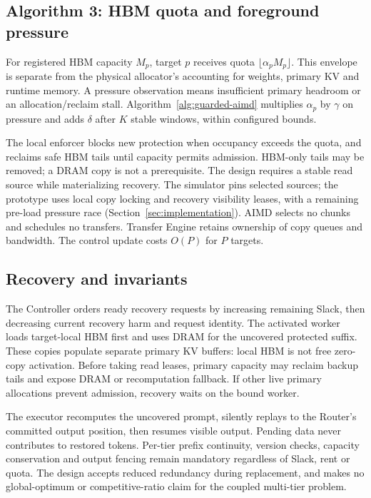 \subsection{Algorithm 3: HBM quota and foreground pressure}
For registered HBM capacity $M_p$, target $p$ receives quota
$\lfloor\alpha_pM_p\rfloor$. This envelope is separate from the physical
allocator's accounting for weights, primary KV and runtime memory. A pressure
observation means insufficient primary headroom or an allocation/reclaim
stall. Algorithm~\ref{alg:guarded-aimd} multiplies $\alpha_p$ by $\gamma$ on
pressure and adds $\delta$ after $K$ stable windows, within configured bounds.

The local enforcer blocks new protection when occupancy exceeds the quota,
and reclaims safe HBM tails until capacity permits admission. HBM-only tails
may be removed; a DRAM copy is not a prerequisite. The design requires a stable read source while materializing recovery.
The simulator pins selected sources; the prototype uses local copy locking
and recovery visibility leases, with a remaining pre-load pressure race
(Section~\ref{sec:implementation}). AIMD selects no
chunks and schedules no transfers. Transfer Engine retains ownership of copy
queues and bandwidth. The control update costs $O(P)$ for $P$ targets.



\subsection{Recovery and invariants}
The Controller orders ready recovery requests by increasing remaining Slack,
then decreasing current recovery harm and request identity. The activated
worker loads target-local HBM first and uses DRAM for the uncovered protected
suffix. These copies populate separate primary KV buffers: local HBM is not
free zero-copy activation. Before taking read leases, primary capacity may
reclaim backup tails and expose DRAM or recomputation fallback. If other live
primary allocations prevent admission, recovery waits on the bound worker.

The executor recomputes the uncovered prompt, silently replays to the Router's
committed output position, then resumes visible output. Pending data never
contributes to restored tokens. Per-tier prefix continuity, version checks,
capacity conservation and output fencing remain mandatory regardless of
Slack, rent or quota. The design accepts reduced redundancy during
replacement, and makes no global-optimum or competitive-ratio claim for the
coupled multi-tier problem.

